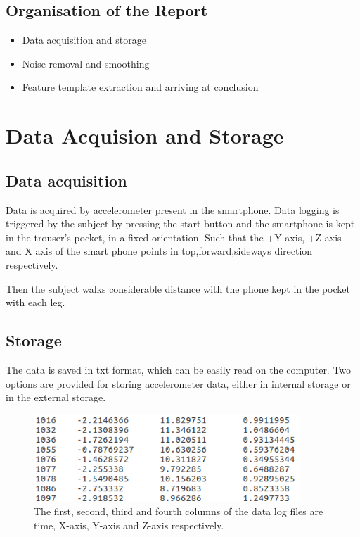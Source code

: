 \documentclass[a4paper]{report}
\begin{document}
\section{Organisation of the Report}
\begin{itemize}
\item Data acquisition and storage
\item Noise removal and smoothing 
\item Feature template extraction and arriving at conclusion
\end{itemize}

\chapter{Data Acquision and Storage}


\section{Data acquisition}
Data is acquired by accelerometer present in the smartphone. Data logging is triggered by the subject by pressing the start button and the smartphone is kept in the trouser’s pocket, in a fixed orientation. Such that the +Y axis, +Z axis and X axis of the smart phone points in top,forward,sideways direction respectively.\newline

Then the subject walks considerable distance with the phone kept in the pocket with each leg.
\section{Storage}

The data is saved in txt format, which can be easily read on the computer. Two options are provided for storing accelerometer data, either in internal storage or in the external storage.\newline

\begin{figure}
\includegraphics[width=100mm,scale=0.5]{pictures/recordedCrop.png}
\caption{The first, second, third and  fourth columns of the data log files are time, X-axis, Y-axis and  Z-axis respectively.}
\end{figure}
\end{document}

